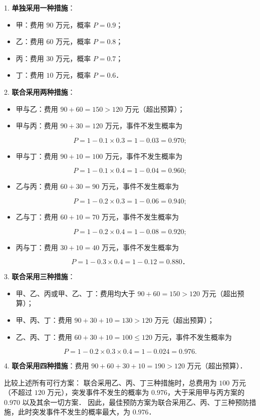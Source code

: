 \begin{answer}
1. \textbf{单独采用一种措施}：
\begin{itemize}
\item 甲：费用 $90$ 万元，概率 $P = 0.9$；
\item 乙：费用 $60$ 万元，概率 $P = 0.8$；
\item 丙：费用 $30$ 万元，概率 $P = 0.7$；
\item 丁：费用 $10$ 万元，概率 $P = 0.6$．
\end{itemize}

2. \textbf{联合采用两种措施}：
\begin{itemize}
\item 甲与乙：费用 $90 + 60 = 150 > 120$ 万元（超出预算）；
\item 甲与丙：费用 $90 + 30 = 120$ 万元，事件不发生概率为
\end{itemize}
\nopagebreak[4]
\[
P = 1 - 0.1 \times 0.3 = 1 - 0.03 = 0.970;
\]
\begin{itemize}
\item 甲与丁：费用 $90 + 10 = 100$ 万元，事件不发生概率为
\end{itemize}
\nopagebreak[4]
\[
P = 1 - 0.1 \times 0.4 = 1 - 0.04 = 0.960;
\]
\begin{itemize}
\item 乙与丙：费用 $60 + 30 = 90$ 万元，事件不发生概率为
\end{itemize}
\nopagebreak[4]
\[
P = 1 - 0.2 \times 0.3 = 1 - 0.06 = 0.940;
\]
\begin{itemize}
\item 乙与丁：费用 $60 + 10 = 70$ 万元，事件不发生概率为
\end{itemize}
\nopagebreak[4]
\[
P = 1 - 0.2 \times 0.4 = 1 - 0.08 = 0.920;
\]
\begin{itemize}
\item 丙与丁：费用 $30 + 10 = 40$ 万元，事件不发生概率为
\end{itemize}
\nopagebreak[4]
\[
P = 1 - 0.3 \times 0.4 = 1 - 0.12 = 0.880．
\]

3. \textbf{联合采用三种措施}：
\begin{itemize}
\item 甲、乙、丙或甲、乙、丁：费用均大于 $90 + 60 = 150 > 120$ 万元（超出预算）；
\item 甲、丙、丁：费用 $90 + 30 + 10 = 130 > 120$ 万元（超出预算）；
\item 乙、丙、丁：费用 $60 + 30 + 10 = 100 \leqslant 120$ 万元，事件不发生概率为
\end{itemize}
\nopagebreak[4]
\[
P = 1 - 0.2 \times 0.3 \times 0.4 = 1 - 0.024 = 0.976.
\]

4. \textbf{联合采用四种措施}：费用 $90 + 60 + 30 + 10 = 190 > 120$ 万元（超出预算）．

比较上述所有可行方案：
联合采用乙、丙、丁三种措施时，总费用为 $100$ 万元（不超过 $120$ 万元），突发事件不发生的概率为 $0.976$，大于采用甲与丙方案的 $0.970$ 以及其余一切方案．
因此，最佳预防方案为联合采用乙、丙、丁三种预防措施，此时突发事件不发生的概率最大，为 $0.976$．


\end{answer}
